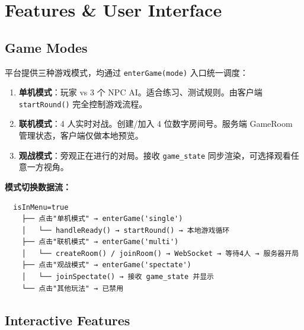 \documentclass[11pt,a4paper]{article}
\begin{document}
\section{Features \& User Interface}

\subsection{Game Modes}

平台提供三种游戏模式，均通过 \texttt{enterGame(mode)} 入口统一调度：

\begin{enumerate}[nosep]
  \item \textbf{单机模式}：玩家 vs 3 个 NPC AI。适合练习、测试规则。由客户端 \texttt{startRound()} 完全控制游戏流程。
  \item \textbf{联机模式}：4 人实时对战。创建/加入 4 位数字房间号。服务端 GameRoom 管理状态，客户端仅做本地预览。
  \item \textbf{观战模式}：旁观正在进行的对局。接收 \texttt{game\_state} 同步渲染，可选择观看任意一方视角。
\end{enumerate}

\textbf{模式切换数据流：}
\begin{verbatim}
  isInMenu=true
    ├── 点击"单机模式" → enterGame('single')
    │   └── handleReady() → startRound() → 本地游戏循环
    ├── 点击"联机模式" → enterGame('multi')
    │   └── createRoom() / joinRoom() → WebSocket → 等待4人 → 服务器开局
    ├── 点击"观战模式" → enterGame('spectate')
    │   └── joinSpectate() → 接收 game_state 并显示
    └── 点击"其他玩法" → 已禁用
\end{verbatim}

\subsection{Interactive Features}
\end{document}
